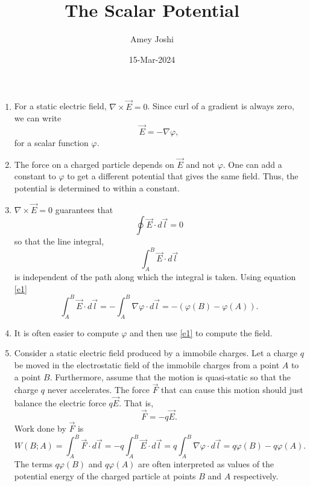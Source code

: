 \documentclass{article}
\title{The Scalar Potential}
\author{Amey Joshi}
\date{15-Mar-2024}
\newcommand{\grad}[1]{\nabla{#1}}
\newcommand{\curl}[1]{\nabla\times\vec{#1}}
\begin{document}
\maketitle
\begin{enumerate}
\item For a static electric field, $\curl{E} = 0$. Since curl of a gradient is
always zero, we can write
\begin{equation}\label{e1}
\vec{E} = -\grad\varphi,
\end{equation}
for a scalar function $\varphi$. 

\item The force on a charged particle depends on $\vec{E}$ and not $\varphi$. 
One can add a constant to $\varphi$ to get a different potential that gives 
the same field. Thus, the potential is determined to within a constant.

\item $\curl{E} = 0$ guarantees that
\begin{equation}\label{e2}
\oint\vec{E}\cdot d\vec{l} = 0
\end{equation}
so that the line integral,
\[
\int_A^B \vec{E}\cdot d\vec{l}
\]
is independent of the path along which the integral is taken. Using equation 
\eqref{e1}
\begin{equation}\label{e3}
\int_A^B \vec{E}\cdot d\vec{l} = -\int_A^B\grad{\varphi}\cdot d\vec{l} = 
-(\varphi(B) - \varphi(A)).
\end{equation}

\item It is often easier to compute $\varphi$ and then use \eqref{e1} to compute
the field. 

\item Consider a static electric field produced by a immobile charges. Let a
charge $q$ be moved in the electrostatic field of the immobile charges from a 
point $A$ to a point $B$. Furthermore, assume that the motion is quasi-static
so that the charge $q$ never accelerates. The force $\vec{F}$ that can cause
this motion should just balance the electric force $q\vec{E}$. That is,
\[
\vec{F} = -q\vec{E}.
\]
Work done by $\vec{F}$ is
\begin{equation}\label{e4}
W(B; A) = \int_A^B\vec{F}\cdot d\vec{l} = -q\int_A^B\vec{E}\cdot d\vec{l} = 
q\int_A^B\grad{\varphi}\cdot d\vec{l} = q\varphi(B) - q\varphi(A).
\end{equation}
The terms $q\varphi(B)$ and $q\varphi(A)$ are often interpreted as values of the
potential energy of the charged particle at points $B$ and $A$ respectively.


\end{enumerate}
\end{document}
